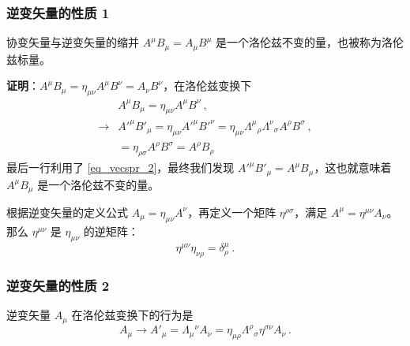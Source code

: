 \subsubsection{逆变矢量的性质 1}
\begin{lemma}{}
协变矢量与逆变矢量的缩并 $A^\mu B_\mu=A_\mu B^\mu$ 是一个洛伦兹不变的量，也被称为洛伦兹标量。
\end{lemma}
\textbf{证明}：$A^\mu B_\mu = \eta_{\mu\nu}A^\mu B^\nu=A_\nu B^\nu$，在洛伦兹变换下 \begin{equation}
\begin{aligned}
&A^\mu B_\mu = \eta_{\mu\nu}A^\mu B^\nu ~,\\
\rightarrow &{A'}^\mu {B'}_\mu =\eta_{\mu\nu}{A'}^\mu {B'}^\nu = \eta_{\mu\nu}\Lambda^{\mu}{}_\rho\Lambda^\nu{}_\sigma A^\rho  B^\sigma~,\\
&=\eta_{\rho\sigma}A^\rho B^\sigma = A^\rho B_\rho
\end{aligned}
\end{equation}
最后一行利用了 \autoref{eq_vecspr_2}，最终我们发现 ${A'}^\mu {B'}_\mu = A^\mu B_\mu $，这也就意味着 $A^\mu B_\mu$ 是一个洛伦兹不变的量。
\begin{lemma}{}
根据逆变矢量的定义公式 $A_\mu = \eta_{\mu\nu}A^\nu$，再定义一个矩阵 $\eta^{\rho\sigma}$，满足 $A^\mu = \eta^{\mu\nu} A_\nu$。那么 $\eta^{\mu\nu}$ 是 $\eta_{\mu\nu}$ 的逆矩阵：
\begin{equation}
\eta^{\mu\nu}\eta_{\nu\rho}=\delta^{\mu}_\rho~.
\end{equation}
\end{lemma}
\subsubsection{逆变矢量的性质 2}
\begin{lemma}{}
逆变矢量 $A_\mu$ 在洛伦兹变换下的行为是
\begin{equation}
A_\mu \rightarrow  A'_\mu = \Lambda_{\mu}{}^\nu A_\nu=\eta_{\mu\rho}\Lambda^{\rho}{}_\sigma \eta^{\sigma\nu} A_\nu~.
\end{equation}

\end{lemma}